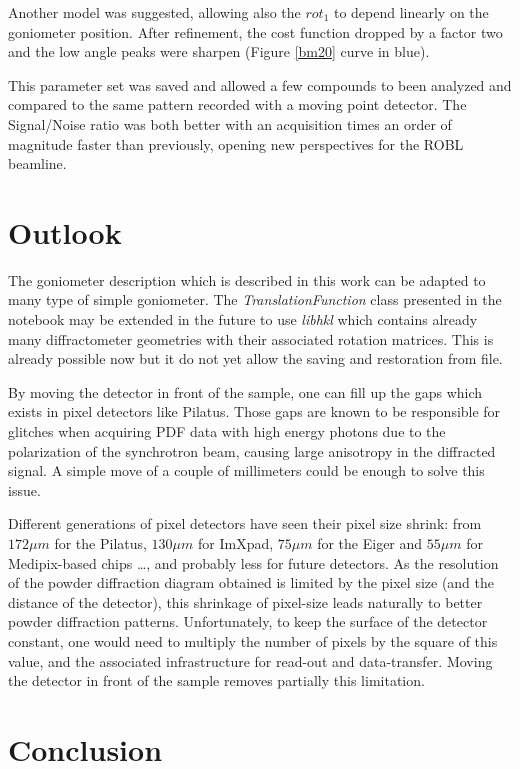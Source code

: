 \documentclass[preprint, pdf]{iucr}              %
\begin{document}
Another model was suggested, allowing also the $rot_1$ to depend linearly on the
goniometer position. 
After refinement, the cost function dropped by a factor two and
the low angle peaks were sharpen (Figure \ref{bm20} curve in blue). 

This parameter set was saved and allowed a few compounds to been analyzed and
compared to the same pattern recorded with a moving point detector. 
The Signal/Noise ratio was both better with an acquisition times an order
of magnitude faster than previously, opening new perspectives for the ROBL
beamline.

\section{Outlook}

The goniometer description which is described in this work can be adapted to
many type of simple goniometer.
The \textit{TranslationFunction} class presented in the notebook may be extended
in the future to use \textit{libhkl}\cite{picca} which contains already many
diffractometer geometries with their associated rotation matrices. 
This is already possible now but it do not yet allow the saving and
restoration from file. 

By moving the detector in front of the sample, one can fill up the
gaps which exists in pixel detectors like Pilatus. 
Those gaps are known to be responsible for glitches
when acquiring PDF data with high energy photons due to the
polarization of the synchrotron beam, causing large anisotropy in the
diffracted signal. 
A simple move of a couple of millimeters could be enough to solve this issue. 

Different generations of pixel detectors have seen their pixel size
shrink:
from $172 \mu m$ for the Pilatus, $130 \mu m$ for ImXpad, $75 \mu m$ for the
Eiger and $55 \mu m$ for Medipix-based chips \ldots, and probably less for
future detectors.
As the resolution of the powder diffraction diagram obtained is limited by the
pixel size (and the distance of the detector), this shrinkage of pixel-size
leads naturally to better powder diffraction patterns. 
Unfortunately, to keep the surface of the detector constant, one would need
to multiply the number of pixels by the square of this value, and the
associated infrastructure for read-out and data-transfer. 
Moving the detector in front of the sample removes partially this limitation.

\section{Conclusion}
\end{document}
